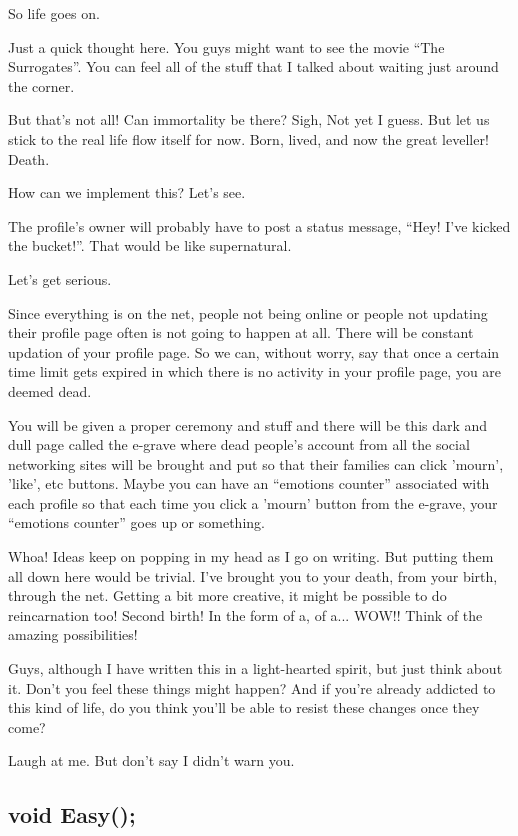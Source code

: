 \documentclass[twoside,11pt]{article}
\begin{document}
So life goes on.

Just a quick thought here. You guys might want to see the movie ``The Surrogates''. You can feel all of the stuff that I talked about waiting just around the corner.

But that's not all! Can immortality be there? Sigh, Not yet I guess. But let us stick to the real life flow itself for now. Born, lived, and now the great leveller! Death.

How can we implement this? Let's see.

The profile's owner will probably have to post a status message, ``Hey! I've kicked the bucket!''. That would be like supernatural.

Let's get serious.

Since everything is on the net, people not being online or people not updating their profile page often is not going to happen at all. There will be constant updation of your profile page. So we can, without worry, say that once a certain time limit gets expired in which there is no activity in your profile page, you are deemed dead.

You will be given a proper ceremony and stuff and there will be this dark and dull page called the e-grave where dead people's account from all the social networking sites will be brought and put so that their families can click 'mourn', 'like', etc buttons. Maybe you can have  an ``emotions counter'' associated with each profile so that each time you click a 'mourn' button from the e-grave, your ``emotions counter'' goes up or something.

Whoa! Ideas keep on popping in my head as I go on writing. But putting them all down here would be trivial. I've brought you to your death, from your birth, through the net. Getting a bit more creative, it might be possible to do reincarnation too! Second birth! In the form of a, of a... WOW!! Think of the amazing possibilities!

Guys, although I have written this in a light-hearted spirit, but just think about it. Don't you feel these things might happen? And if you're already addicted to this kind of life, do you think you'll be able to resist these changes once they come?

Laugh at me. But don't say I didn't warn you.

\newpage
\begin{center}
  \section{void Easy();}
\end{center}
\bigskip
\bigskip
\bigskip
\end{document}
